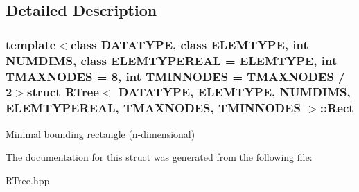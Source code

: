 \subsection{\-Detailed \-Description}
\subsubsection*{template$<$class \-D\-A\-T\-A\-T\-Y\-P\-E, class \-E\-L\-E\-M\-T\-Y\-P\-E, int \-N\-U\-M\-D\-I\-M\-S, class \-E\-L\-E\-M\-T\-Y\-P\-E\-R\-E\-A\-L = \-E\-L\-E\-M\-T\-Y\-P\-E, int \-T\-M\-A\-X\-N\-O\-D\-E\-S = 8, int \-T\-M\-I\-N\-N\-O\-D\-E\-S = \-T\-M\-A\-X\-N\-O\-D\-E\-S / 2$>$struct R\-Tree$<$ D\-A\-T\-A\-T\-Y\-P\-E, E\-L\-E\-M\-T\-Y\-P\-E, N\-U\-M\-D\-I\-M\-S, E\-L\-E\-M\-T\-Y\-P\-E\-R\-E\-A\-L, T\-M\-A\-X\-N\-O\-D\-E\-S, T\-M\-I\-N\-N\-O\-D\-E\-S $>$\-::\-Rect}

\-Minimal bounding rectangle (n-\/dimensional) 

\-The documentation for this struct was generated from the following file\-:\begin{DoxyCompactItemize}
\item 
\-R\-Tree.\-hpp\end{DoxyCompactItemize}

